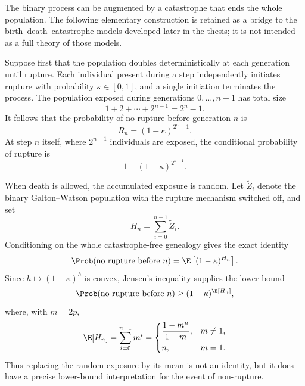 The binary process can be augmented by a catastrophe that ends the whole population.
The following elementary construction is retained as a bridge to the
birth--death--catastrophe models developed later in the thesis; it is not intended
as a full theory of those models.

Suppose first that the population doubles deterministically at each generation until
rupture.  Each individual present during a step independently initiates rupture with
probability \(\kappa\in[0,1]\), and a single initiation terminates the process.  The
population exposed during generations \(0,\ldots,n-1\) has total size
\begin{equation}
  1+2+\cdots+2^{n-1}=2^n-1.
\end{equation}
It follows that the probability of no rupture before generation \(n\) is
\begin{equation}
  R_n=(1-\kappa)^{2^n-1}.
  \label{eq:pure-birth-no-rupture}
\end{equation}
At step \(n\) itself, where \(2^{n-1}\) individuals are exposed, the conditional
probability of rupture is
\begin{equation}
  1-(1-\kappa)^{2^{n-1}}.
  \label{eq:rupture-at-step}
\end{equation}

When death is allowed, the accumulated exposure is random.  Let
\(\widetilde Z_i\) denote the binary Galton--Watson population with the rupture
mechanism switched off, and set
\begin{equation}
  H_n=\sum_{i=0}^{n-1}\widetilde Z_i.
  \label{eq:exposure-Hn}
\end{equation}
Conditioning on the whole catastrophe-free genealogy gives the exact identity
\begin{equation}
  \Prob(\text{no rupture before }n)
  =\E\left[(1-\kappa)^{H_n}\right].
  \label{eq:no-rupture-expectation}
\end{equation}
Since \(h\mapsto(1-\kappa)^h\) is convex, Jensen's inequality supplies the lower
bound
\begin{equation}
  \Prob(\text{no rupture before }n)
  \geq(1-\kappa)^{\E[H_n]},
  \label{eq:no-rupture-jensen}
\end{equation}
where, with \(m=2p\),
\begin{equation}
  \E[H_n]=\sum_{i=0}^{n-1}m^i
  =
  \begin{cases}
    \dfrac{1-m^n}{1-m},&m\neq1,\\[2mm]
    n,&m=1.
  \end{cases}
  \label{eq:mean-exposure}
\end{equation}
Thus replacing the random exposure by its mean is not an identity, but it does have
a precise lower-bound interpretation for the event of non-rupture.

